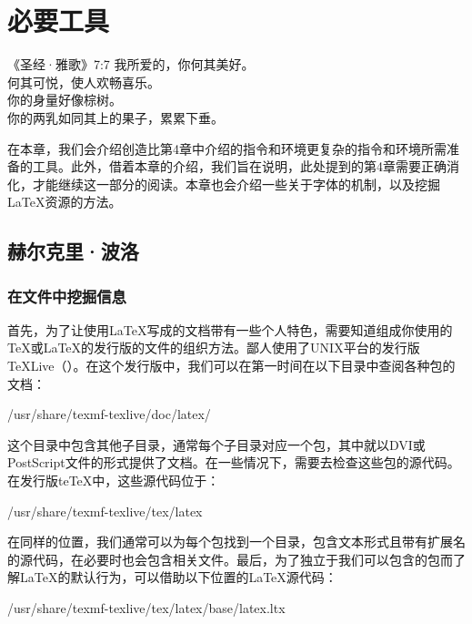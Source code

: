 \chapter{必要工具}

\begin{epigraphe}{《圣经·雅歌》7:7}
    我所爱的，你何其美好。\\何其可悦，使人欢畅喜乐。\\你的身量好像棕树。\\你的两乳如同其上的果子，累累下垂。
\end{epigraphe}

在本章，我们会介绍创造比第4章中介绍的指令和环境更复杂的指令和环境所需准备的工具。此外，借着本章的介绍，我们旨在说明，此处提到的第4章需要正确消化，才能继续这一部分的阅读。本章也会介绍一些关于字体的机制，以及挖掘\LaTeX 资源的方法。

\section{赫尔克里·波洛}

\subsection{在文件中挖掘信息}

首先，为了让使用\LaTeX 写成的文档带有一些个人特色，需要知道组成你使用的\TeX 或\LaTeX 的发行版的文件的组织方法。鄙人使用了UNIX平台的发行版\TeX Live（）。在这个发行版中，我们可以在第一时间在以下目录中查阅各种包的文档：

\begin{dmd}
/usr/share/texmf-texlive/doc/latex/
\end{dmd}

这个目录中包含其他子目录，通常每个子目录对应一个包，其中就以DVI或PostScript文件的形式提供了文档。在一些情况下，需要去检查这些包的源代码。在发行版te\TeX 中，这些源代码位于：

\begin{dmd}
/usr/share/texmf-texlive/tex/latex
\end{dmd}

在同样的位置，我们通常可以为每个包找到一个目录，包含文本形式且带有扩展名的源代码，在必要时也会包含相关文件。最后，为了独立于我们可以包含的包而了解\LaTeX 的默认行为，可以借助以下位置的\LaTeX 源代码：

\begin{dmd}
/usr/share/texmf-texlive/tex/latex/base/latex.ltx
\end{dmd}

